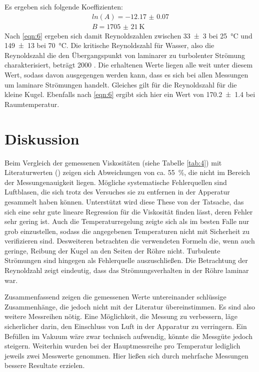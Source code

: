 Es ergeben sich folgende Koeffizienten:
\begin{equation*}
  \begin{split}
    ln(A) = \num{-12.17(7)} \\
    B = \SI{1705(21)}{\kelvin}
  \end{split}
\end{equation*}
Nach \eqref{eqn:6} ergeben sich damit Reynoldszahlen zwischen \num{33(3)} bei \SI{25}{\celsius}
und \num{149(13)} bei \SI{70}{\celsius}. Die kritische Reynoldszahl für Wasser, also die Reynoldszahl die den Übergangspunkt von
laminarer zu turbolenter Strömung charakterisiert, beträgt 2000 \cite[4]{Reynold}. Die erhaltenen Werte liegen alle weit unter diesem Wert,
sodass davon ausgegengen werden kann, dass es sich bei allen Messungen um laminare Strömungen handelt.
Gleiches gilt für die Reynoldszahl für die kleine Kugel. Ebenfalls nach \eqref{eqn:6} ergibt sich hier ein Wert von
\num{170.2(14)} bei Raumtemperatur.
\section{Diskussion}
Beim Vergleich der gemessenen Viskositäten (siehe Tabelle \ref{tab:4}) mit Literaturwerten (\cite[1]{LitEta})
zeigen sich Abweichungen von ca. \SI{55}{\percent}, die nicht im Bereich der Messungenauigkeit liegen.
Mögliche systematische Fehlerquellen sind Luftblasen, die sich trotz des Versuches sie zu entfernen in der Apperatur gesammelt
haben können. Unterstützt wird diese These von der Tatsache, das sich eine sehr gute lineare Regression
für die Viskosität finden lässt, deren Fehler sehr gering ist. Auch die Temperaturregelung zeigte sich
als im besten Falle nur grob einzustellen, sodass die angegebenen Temperaturen nicht mit Sicherheit zu
verifizieren sind. Desweiteren betrachten die verwendeten Formeln die, wenn auch geringe, Reibung der Kugel
an den Seiten der Röhre nicht.
Turbulente Strömungen sind hingegen als Fehlerquelle auszuschließen. Die Betrachtung der Reynoldzahl zeigt eindeutig, dass das
Strömungsverhalten in der Röhre laminar war.

Zusammenfassend zeigen die gemessenen Werte untereinander schlüssige Zusammenhänge, die jedoch nicht mit der Literatur übereinstimmen.
Es sind also weitere Messreihen nötig. Eine Möglichkeit, die Messung zu verbessern, läge sicherlicher darin, den Einschluss von
Luft in der Apparatur zu verringern. Ein Befüllen im Vakuum wäre zwar technisch aufwendig, könnte die Messgüte jedoch steigern.
Weiterhin wurden bei der Hauptmessreihe pro Temperatur lediglich jeweils zwei Messwerte genommen. Hier ließen sich
durch mehrfache Messungen bessere Resultate erzielen.
\newpage
\nocite{*}
\printbibliography
